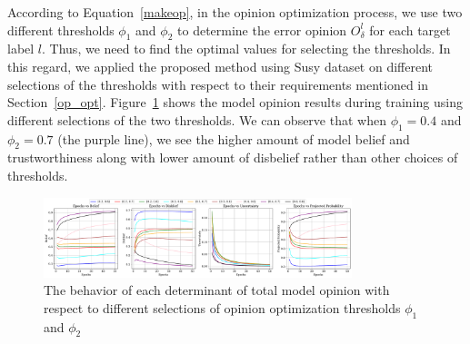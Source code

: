 {\color{blue} According to Equation~\ref{makeop}, in the opinion optimization process, we use two different thresholds $\phi_1$ and $\phi_2$ to determine the error opinion $O_\delta^l$ for each target label $l$. Thus, we need to find the optimal values for selecting the thresholds. In this regard, we applied the proposed method using Susy dataset on different selections of the thresholds with respect to their requirements mentioned in Section~\ref{op_opt}. Figure~\ref{susy_thr} shows the model opinion results during training using different selections of the two thresholds. We can observe that when $\phi_1=0.4$ and $\phi_2=0.7$ (the purple line), we see the higher amount of model belief and trustworthiness along with lower amount of disbelief rather than other choices of thresholds.
}
\begin{figure}[t]  %
	\centering %
	\includegraphics[width=0.8\textwidth]{figures/Results_susy_thr.pdf}
	\vspace{-0.3cm}
	\caption{The behavior of each determinant of total model opinion with respect to different selections of opinion optimization thresholds $\phi_1$ and $\phi_2$}
	\label{susy_thr}
\end{figure}





